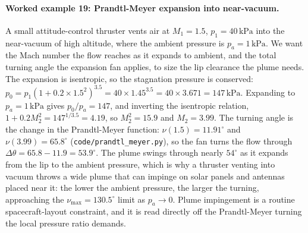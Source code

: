 \paragraph{Worked example 19: Prandtl-Meyer expansion into near-vacuum.}
A small attitude-control thruster vents air at $M_1 = 1.5$,
$p_1 = 40\,\text{kPa}$ into the near-vacuum of high altitude, where the
ambient pressure is $p_a = 1\,\text{kPa}$. We want the Mach number the
flow reaches as it expands to ambient, and the total turning angle the
expansion fan applies, to size the lip clearance the plume needs. The
expansion is isentropic, so the stagnation pressure is conserved:
$p_0 = p_1(1 + 0.2\times 1.5^2)^{3.5} = 40\times 1.45^{3.5} =
40\times 3.671 = 147\,\text{kPa}$. Expanding to $p_a = 1\,\text{kPa}$
gives $p_0/p_a = 147$, and inverting the isentropic relation,
$1 + 0.2 M_2^2 = 147^{1/3.5} = 4.19$, so $M_2^2 = 15.9$ and
$M_2 = 3.99$. The turning angle is the change in the Prandtl-Meyer
function: $\nu(1.5) = 11.91^{\circ}$ and $\nu(3.99) = 65.8^{\circ}$
(\texttt{code/prandtl\_meyer.py}), so the fan turns the flow through
$\Delta\theta = 65.8 - 11.9 = 53.9^{\circ}$. The plume swings through
nearly $54^{\circ}$ as it expands from the lip to the ambient
pressure, which is why a thruster venting into vacuum throws a wide
plume that can impinge on solar panels and antennas placed near it: the
lower the ambient pressure, the larger the turning, approaching the
$\nu_{\max} = 130.5^{\circ}$ limit as $p_a \to 0$. Plume impingement is
a routine spacecraft-layout constraint, and it is read directly off the
Prandtl-Meyer turning the local pressure ratio demands.

